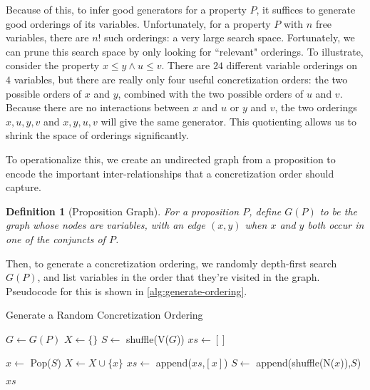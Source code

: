 \documentclass[sigconf,nonacm]{acmart}
\newtheorem{definition}{Definition}
\begin{document}
Because of this, to infer good generators for a property $P$, it suffices to generate good orderings of its variables. Unfortunately, for a property $P$ with $n$ free variables, there are $n!$ such orderings: a very large search space. Fortunately, we can prune this search space by only looking for ``relevant" orderings. To illustrate, consider the property $x \leq y \wedge u \leq v$. There are $24$ different variable orderings on $4$ variables, but there are really only four useful concretization orders: the two possible orders of $x$ and $y$, combined with the two possible orders of $u$ and $v$. Because there are no interactions between $x$ and $u$ or $y$ and $v$, the two orderings $x,u,y,v$ and $x,y,u,v$ will give the same generator. This quotienting allows us to shrink the space of orderings significantly.

To operationalize this, we create an undirected graph from a proposition to encode the important inter-relationships that a concretization order should capture.

\begin{definition}[Proposition Graph]
For a proposition $P$, define $G(P)$ to be the graph whose nodes are variables, with an edge $(x,y)$ when $x$ and $y$ both occur in one of the conjuncts of $P$.
\end{definition}

Then, to generate a concretization ordering, we randomly depth-first search $G(P)$, and list variables in the order that they're visited in the graph. Pseudocode for this is shown in \autoref{alg:generate-ordering}.

\begin{algorithm}
    \caption{Generate a Random Concretization Ordering}
    \label{alg:generate-ordering}
    \begin{algorithmic}
      \State $G \gets G(P)$ 
      \State $X \gets \{\}$
      \State $S \gets $ shuffle(V($G$))
      \State $xs \gets []$
      
       \State $x \gets $ Pop($S$)
         \State $X \gets X \cup \{x\}$
         \State $xs \gets $ append($xs$,$[x]$)
         \State $S \gets $ append(shuffle(N($x$)),$S$)
       \EndIf

      \EndWhile
      
      \Return $xs$
      
      \EndFunction
    \end{algorithmic}
\end{algorithm}
\end{document}

